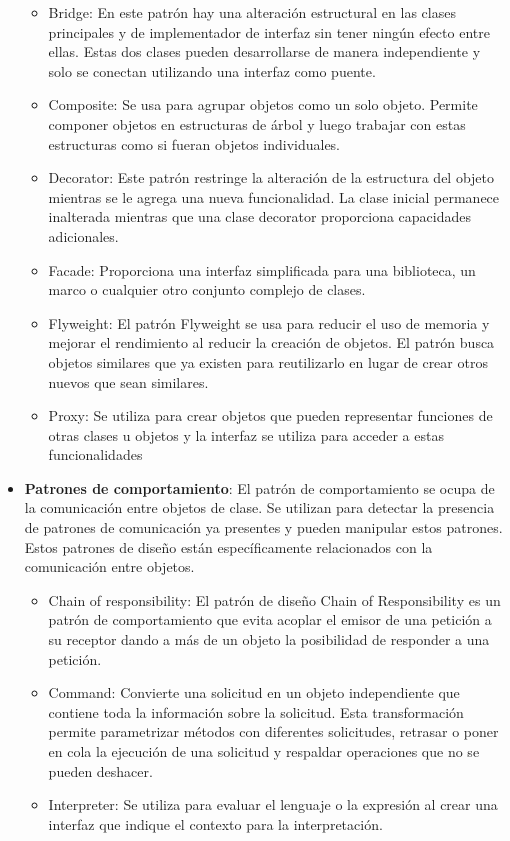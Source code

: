 \documentclass[
	12pt, %
	fleqn, %
	a4paper, %
	oneside, %
]{LegrandOrangeBook}
\begin{document}
\begin{itemize}
\begin{itemize}
\item Bridge: En este patrón hay una alteración estructural en las clases principales y de implementador de interfaz sin tener ningún efecto entre ellas. Estas dos clases pueden desarrollarse de manera independiente y solo se conectan utilizando una interfaz como puente.
\item Composite: Se usa para agrupar objetos como un solo objeto. Permite componer objetos en estructuras de árbol y luego trabajar con estas estructuras como si fueran objetos individuales.
\item Decorator: Este patrón restringe la alteración de la estructura del objeto mientras se le agrega una nueva funcionalidad. La clase inicial permanece inalterada mientras que una clase decorator proporciona capacidades adicionales.
\item Facade: Proporciona una interfaz simplificada para una biblioteca, un marco o cualquier otro conjunto complejo de clases.
\item Flyweight: El patrón Flyweight se usa para reducir el uso de memoria y mejorar el rendimiento al reducir la creación de objetos. El patrón busca objetos similares que ya existen para reutilizarlo en lugar de crear otros nuevos que sean similares.
\item Proxy: Se utiliza para crear objetos que pueden representar funciones de otras clases u objetos y la interfaz se utiliza para acceder a estas funcionalidades
\end{itemize}
\item \textbf{Patrones de comportamiento}: El patrón de comportamiento se ocupa de la comunicación entre objetos de clase. Se utilizan para detectar la presencia de patrones de comunicación ya presentes y pueden manipular estos patrones. Estos patrones de diseño están específicamente relacionados con la comunicación entre objetos.
\begin{itemize}
\item Chain of responsibility: El patrón de diseño Chain of Responsibility es un patrón de comportamiento que evita acoplar el emisor de una petición a su receptor dando a más de un objeto la posibilidad de responder a una petición.
\item Command: Convierte una solicitud en un objeto independiente que contiene toda la información sobre la solicitud. Esta transformación permite parametrizar métodos con diferentes solicitudes, retrasar o poner en cola la ejecución de una solicitud y respaldar operaciones que no se pueden deshacer.
\item Interpreter: Se utiliza para evaluar el lenguaje o la expresión al crear una interfaz que indique el contexto para la interpretación.

\end{itemize}
\end{itemize}
\end{document}
